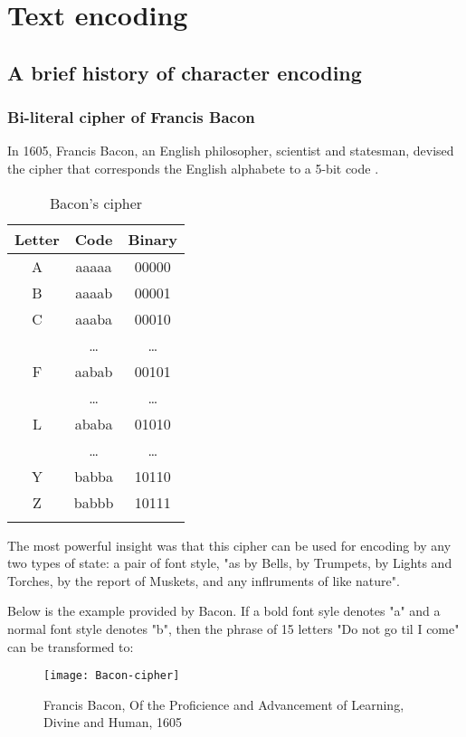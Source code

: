 \chapter{Text encoding}

\section{A brief history of character encoding}

\subsection{Bi-literal cipher of Francis Bacon}

In 1605, Francis Bacon, an English philosopher, scientist and statesman, devised the cipher that corresponds the English alphabete to a 5-bit code \cite{fbakoncipher}.

\begin{longtable}[H]{ c | c | c }
            Letter & Code & Binary \\
            \hline\hline
            A & aaaaa & 00000 \\
            B & aaaab & 00001 \\
            C & aaaba & 00010 \\
            & \dots & \dots \\
            F & aabab & 00101 \\
            & \dots & \dots \\
            L & ababa & 01010 \\
            & \dots & \dots \\
            Y & babba & 10110 \\
            Z & babbb & 10111 \\
            \hline
    \caption{Bacon's cipher}
\end{longtable}

The most powerful insight was that this cipher can be used for encoding by any two types of state: a pair of font style, "as by Bells, by Trumpets, by Lights and Torches, by the report of Muskets, and any inflruments of like nature".

Below is the example provided by Bacon. If a bold font syle denotes "a" and a normal font style denotes "b", then the phrase of 15 letters "Do not go til I come" can be transformed to:

\begin{figure}[t!]
    \texttt{[image: Bacon-cipher]}
    \captionsetup{justification=centering,margin=1cm}
    \caption{Francis Bacon, Of the Proficience and Advancement of Learning, Divine and Human, 1605}
\end{figure}


